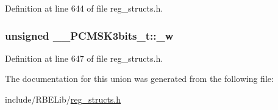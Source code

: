 Definition at line 644 of file reg\+\_\+structs.\+h.

\hypertarget{union_____p_c_m_s_k3bits__t_ac0000dfc6a94e14008689e5e52e75d1a}{
\subsubsection[{\+\_\+w}]{\setlength{\rightskip}{0pt plus 5cm}unsigned \+\_\+\+\_\+\+P\+C\+M\+S\+K3bits\+\_\+t\+::\+\_\+w}}\label{union_____p_c_m_s_k3bits__t_ac0000dfc6a94e14008689e5e52e75d1a}


Definition at line 647 of file reg\+\_\+structs.\+h.



The documentation for this union was generated from the following file\+:\begin{DoxyCompactItemize}
\item 
include/\+R\+B\+E\+Lib/\hyperlink{reg__structs_8h}{reg\+\_\+structs.\+h}\end{DoxyCompactItemize}
